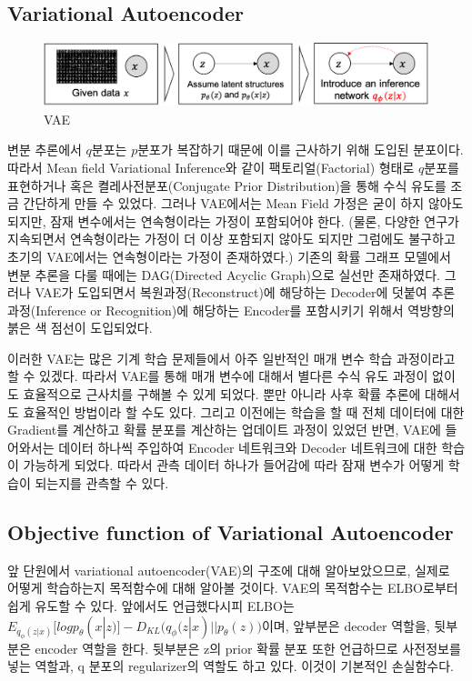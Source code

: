 \documentclass[draft=false]{oblivoir}
\begin{document}
\subsection{Variational Autoencoder}

\begin{figure}[ht] \centering
  \includegraphics[scale=0.7]{fig7.png}
  \caption{VAE}
  \label{fig:17-7}
\end{figure}

변분 추론에서 $q$분포는 $p$분포가 복잡하기 때문에 이를 근사하기 위해 도입된 분포이다. 따라서 Mean field Variational Inference와 같이 팩토리얼(Factorial) 형태로 $q$분포를 표현하거나 혹은 켤레사전분포(Conjugate Prior Distribution)을 통해 수식 유도를 조금 간단하게 만들 수 있었다. 그러나 VAE에서는 Mean Field 가정은 굳이 하지 않아도 되지만, 잠재 변수에서는 연속형이라는 가정이 포함되어야 한다. (물론, 다양한 연구가 지속되면서 연속형이라는 가정이 더 이상 포함되지 않아도 되지만 그럼에도 불구하고 초기의 VAE에서는 연속형이라는 가정이 존재하였다.) 기존의 확률 그래프 모델에서 변분 추론을 다룰 때에는 DAG(Directed Acyclic Graph)으로 실선만 존재하였다. 그러나 VAE가 도입되면서 복원과정(Reconstruct)에 해당하는 Decoder에 덧붙여 추론과정(Inference or Recognition)에 해당하는 Encoder를 포함시키기 위해서 역방향의 붉은 색 점선이 도입되었다.

이러한 VAE는 많은 기계 학습 문제들에서 아주 일반적인 매개 변수 학습 과정이라고 할 수 있겠다. 따라서 VAE를 통해 매개 변수에 대해서 별다른 수식 유도 과정이 없이도 효율적으로 근사치를 구해볼 수 있게 되었다. 뿐만 아니라 사후 확률 추론에 대해서도 효율적인 방법이라 할 수도 있다. 그리고 이전에는 학습을 할 때 전체 데이터에 대한 Gradient를 계산하고 확률 분포를 계산하는 업데이트 과정이 있었던 반면, VAE에 들어와서는 데이터 하나씩 주입하여 Encoder 네트워크와 Decoder 네트워크에 대한 학습이 가능하게 되었다. 따라서 관측 데이터 하나가 들어감에 따라 잠재 변수가 어떻게 학습이 되는지를 관측할 수 있다.

\subsection{Objective function of Variational Autoencoder}
앞 단원에서 variational autoencoder(VAE)의 구조에 대해 알아보았으므로, 실제로 어떻게 학습하는지 목적함수에 대해 알아볼 것이다. VAE의 목적함수는 ELBO로부터 쉽게 유도할 수 있다. 앞에서도 언급했다시피 ELBO는 $E_{q_\phi(z|x)} [logp_\theta (x|z)]-D_{KL} \Big(q_\phi (z|x)||p_\theta (z)\Big)$이며, 앞부분은 decoder 역할을, 뒷부분은 encoder 역할을 한다. 뒷부분은 z의 prior 확률 분포 또한 언급하므로 사전정보를 넣는 역할과, q 분포의 regularizer의 역할도 하고 있다. 이것이 기본적인 손실함수다.
\end{document}
